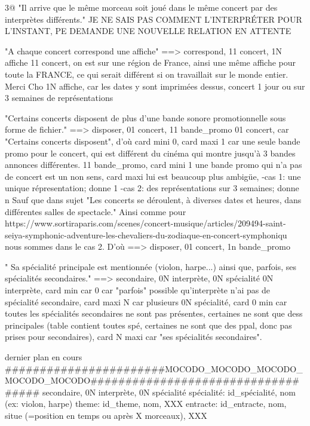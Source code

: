 \documentclass[12pt,a4paper]{article}
\begin{document}
{3@ "Il arrive que le même morceau soit joué dans le même concert par des interprètes différents."
JE NE SAIS PAS COMMENT L'INTERPRÉTER POUR L'INSTANT, PE DEMANDE UNE NOUVELLE RELATION
EN ATTENTE



"A chaque concert correspond une affiche"
==> correspond, 11 concert, 1N affiche
11 concert, on est sur une région de France, ainsi une même affiche pour toute la FRANCE, ce qui serait différent si on travaillait sur le monde entier. Merci Cho
1N affiche, car les dates y sont imprimées dessus, concert 1 jour ou sur 3 semaines de représentations


"Certains concerts disposent de plus d'une bande sonore promotionnelle sous forme de fichier."
==> disposer, 01 concert, 11 bande_promo
01 concert, car "Certains concerts disposent", d'où card mini 0, card maxi 1 car une seule bande promo pour le concert, qui est différent du cinéma qui montre jusqu'à 3 bandes annonces différentes.
11 bande_promo, card mini 1 une bande promo qui n'a pas de concert est un non sens, card maxi lui est beaucoup plus ambigüe, 
	-cas 1: une unique répresentation; donne 1
	-cas 2: des représentations sur 3 semaines; donne n
Sauf que dans sujet "Les concerts se déroulent, à diverses dates et heures, dans différentes salles de spectacle." Ainsi comme pour https://www.sortiraparis.com/scenes/concert-musique/articles/209494-saint-seiya-symphonic-adventure-les-chevaliers-du-zodiaque-en-concert-symphoniqu
nous sommes dans le cas 2. D'où 
==> disposer, 01 concert, 1n bande_promo



" Sa spécialité principale est mentionnée (violon, harpe...) ainsi que, parfois, ses spécialités secondaires."
==> secondaire, 0N interprète, 0N spécialité
0N interprète, card min car 0 car "parfois" possible qu'interprète n'ai pas de spécialité secondaire,
card maxi N car plusieurs
0N spécialité, card 0 min car toutes les spécialités secondaires ne sont pas présentes, certaines ne sont que dess principales (table contient toutes spé, certaines ne sont que des ppal, donc pas prises pour secondaires), 
card N maxi car "ses spécialités secondaires".




dernier plan en cours
#######################MOCODO_MOCODO_MOCODO_MOCODO_MOCODO###################################
secondaire, 0N interprète, 0N spécialité
spécialité: id_spécialité, nom (ex: violon, harpe)
theme: id_theme, nom, XXX
entracte: id_entracte, nom, situe (=position en temps ou après X morceaux), XXX

}
\end{document}
